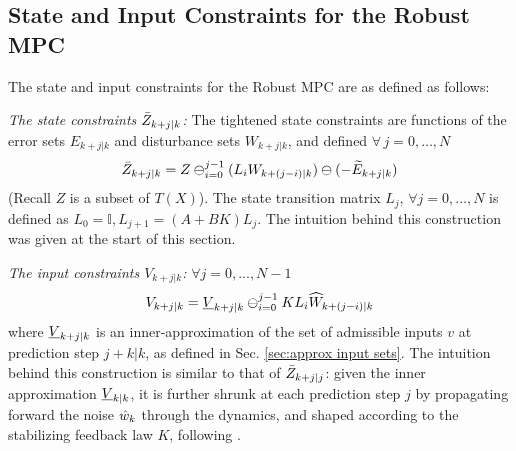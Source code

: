\subsection{State and Input Constraints for the Robust MPC}
\label{sec:Constraints}
The state and input constraints for the Robust MPC are as defined as follows:

\textit{The state constraints $\bar{Z}_{k+j|k}$:}
The tightened state constraints are functions of the error sets $E_{k+j|k}$ and disturbance sets $W_{k+j|k}$, and defined $\forall\,j=0,\dotsc,N$
{\small{
\begin{equation} 
\label{eq:Set_constraints}
\bar{Z}_{k+j|k} = Z \ominus_{i=0}^{j-1}(L_iW_{k+(j-i)|k})\ominus (-\widetilde{E}_{k+j|k})
\end{equation}
}}
(Recall $Z$ is a subset of $T(X)$).
The state transition matrix $L_j$, $\forall j=0,\dotsc,N$   is defined as $L_0 = \mathbb{I}, L_{j+1} = (A+BK)L_j $.
The intuition behind this construction was given at the start of this section.

\textit{The input constraints $V_{k+j|k}$:}
$\forall j=0,...,N-1$
\begin{equation} 
\label{eq:input_constraints}
V_{k+j|k} = \underline{V}_{k+j|k} \ominus_{i=0}^{j-1}KL_i\widehat{W}_{k+(j-i)|k} 
\end{equation}
where $\underline{V}_{k+j|k} $ is an inner-approximation of the set of admissible inputs $v$ at prediction step $j+k|k$, as defined in Sec. \ref{sec:approx input sets}.
The intuition behind this construction is similar to that of $\bar{Z}_{k+j|j}$: given the inner approximation $\underline{V}_{k|k} $, it is further shrunk at each prediction step $j$ by propagating forward the noise $\hat{w}_k$ through the dynamics, and shaped according to the stabilizing feedback law $K$, following \cite{RichardsH05_RMPC}.

